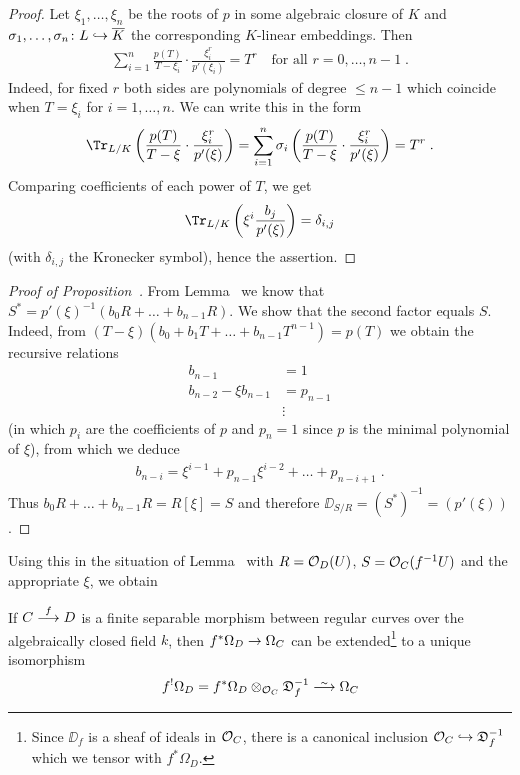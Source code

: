 \documentclass[a4paper,parskip=half,numbers=enddot, DIV=12]{scrreprt}
\begin{document}
\begin{proof}
	Let $\xi_1,\ldots,\xi_n$ be the roots of $p$ in some algebraic closure of $K$ and $\sigma_1,\ldots,\sigma_n\colon L\monomorphism\ov{K}$ the corresponding $K$-linear embeddings. Then
	\begin{align*}
		\sum_{i=1}^{n}\frac{p(T)}{T-\xi_i}\cdot\frac{\xi_i^r}{p'(\xi_i)}=T^r\quad\text{for all }r=0,\ldots,n-1\;.
	\end{align*}
	Indeed, for fixed $r$ both sides are polynomials of degree $\leq n-1$ which coincide when $T=\xi_i$ for $i=1,\ldots,n$. We can write this in the form
	\begin{align*}
		\Tr_{L/K}\left(\frac{p(T)}{T-\xi}\cdot\frac{\xi_i^r}{p'(\xi)}\right)=\sum_{i=1}^n\sigma_i\left(\frac{p(T)}{T-\xi}\cdot\frac{\xi_i^r}{p'(\xi)}\right)=T^r\;.
	\end{align*}
	Comparing coefficients of each power of $T$, we get
	\begin{align*}
		\Tr_{L/K}\left(\xi^i\frac{b_j}{p'(\xi)}\right)=\delta_{i,j}
	\end{align*}
	(with $\delta_{i,j}$ the Kronecker symbol), hence the assertion.
\end{proof}
\begin{proof}[Proof of Proposition~]
	From Lemma~ we know that $S^*=p'(\xi)^{-1}(b_0R+\ldots+b_{n-1}R)$. We show that the second factor equals $S$. Indeed, from $(T-\xi)(b_0+b_1T+\ldots+b_{n-1}T^{n-1})=p(T)$ we obtain the recursive relations
	\begin{align*}
		b_{n-1}&=1\\
		 b_{n-2}-\xi b_{n-1}&=p_{n-1}\\
		 &\vdots
	\end{align*}
	(in which $p_i$ are the coefficients of $p$ and $p_n=1$ since $p$ is the minimal polynomial of $\xi$), from which we deduce
	\begin{align*}
		b_{n-i}=\xi^{i-1}+p_{n-1}\xi^{i-2}+\ldots+p_{n-i+1}\;.
	\end{align*}
	Thus $b_0R+\ldots+b_{n-1}R=R[\xi]=S$ and therefore $\DD_{S/R}=(S^*)^{-1}=(p'(\xi))$.
\end{proof}
Using this in the situation of Lemma~ with $R=\mathcal{O}_D(U)$, $S=\mathcal{O}_C(f^{-1}U)$ and the appropriate $\xi$, we obtain
\begin{prop}
	If $C\morphism[f]D$ is a finite separable morphism between regular curves over the algebraically closed field $k$, then $f^*\Omega_D\morphism\Omega_C$ can be extended\footnote{Since $\DD_f$ is a sheaf of ideals in $\mathcal{O}_C$, there is a canonical inclusion $\Oo_C\monomorphism\DD_f^{-1}$ which we tensor with $f^*\Omega_D$.} to a unique isomorphism
	\begin{align*}
		f^!\Omega_D=f^*\Omega_D\otimes_{\Oo_C}\DD_f^{-1}\isomorphism\Omega_C
	\end{align*}
\end{prop}
\end{document}
